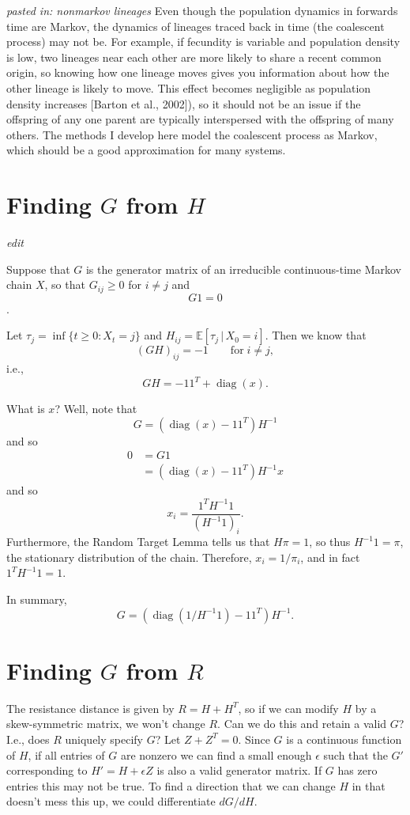 \documentclass{article}
\DeclareMathOperator{\diag}{\mathop{\mbox{diag}}}
\newcommand{\E}{\mathbb{E}}
\newcommand{\plr}[1]{{\em \color{blue} #1}}
\begin{document}
\plr{pasted in: nonmarkov lineages}
Even though the population dynamics in forwards time are Markov, the dynamics of lineages traced back
in time (the coalescent process) may not be. For example, if fecundity is variable and population density
is low, two lineages near each other are more likely to share a recent common origin, so knowing how one
lineage moves gives you information about how the other lineage is likely to move. This effect becomes
negligible as population density increases [Barton et al., 2002]), so it should not be an issue if the offspring
of any one parent are typically interspersed with the offspring of many others. The methods I develop here
model the coalescent process as Markov, which should be a good approximation for many systems.




\appendix


\section{Finding $G$ from $H$}
\label{apx::hitting_calcs}

\plr{edit}

Suppose that $G$ is the generator matrix of an irreducible continuous-time Markov chain $X$,
so that $G_{ij} \ge 0$ for $i \neq j$ and
$$ G 1 = 0 $$.

Let $\tau_{j} = \inf\{t \ge 0 : X_t = j\}$ and $H_{ij} = \E[\tau_j \,|\, X_0 = i]$.
Then we know that
$$
    (G H)_{ij} = -1 \qquad \text{for} \; i \neq j ,
$$
i.e.,
$$
    GH = - 1 1^T + \diag(x).
$$

What is $x$?  Well, note that
$$
    G = (\diag(x) - 1 1^T) H^{-1}
$$
and so
$$ \begin{aligned}
    0 &= G1 \\
    &= (\diag(x) - 1 1^T) H^{-1} x 
\end{aligned} $$
and so
$$
    x_i = \frac{ 1^T H^{-1} 1 }{ (H^{-1} 1)_i } .
$$
Furthermore,
the Random Target Lemma \citep{aldous} %
tells us that $H \pi = 1$, so thus $H^{-1} 1 = \pi$, the stationary distribution of the chain.
Therefore, $x_i = 1/\pi_i$,
and in fact $1^T H^{-1} 1 = 1$.

In summary,
$$
    G = (\diag(1/H^{-1} 1) - 1 1^T) H^{-1} .
$$


\section{Finding $G$ from $R$}

The resistance distance is given by
$R = H + H^T$, so if we can modify $H$ by a skew-symmetric matrix,
we won't change $R$.
Can we do this and retain a valid $G$?
I.e., does $R$ uniquely specify $G$?
Let $Z + Z^T = 0$. 
Since $G$ is a continuous function of $H$, if all entries of $G$ are nonzero
we can find a small enough $\epsilon$ such that the $G'$ corresponding to $H' = H + \epsilon Z$
is also a valid generator matrix.
If $G$ has zero entries this may not be true.
To find a direction that we can change $H$ in that doesn't mess this up,
we could differentiate $dG/dH$.
\end{document}
